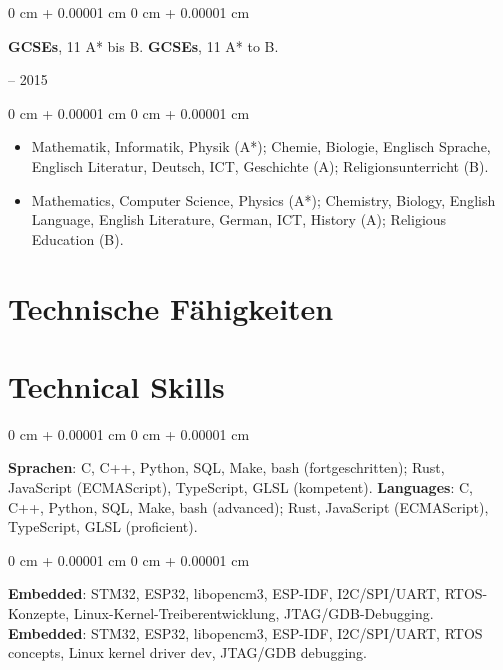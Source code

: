 \documentclass[10pt, letterpaper]{article}
\newenvironment{highlights}{
    \begin{itemize}[
        topsep=0.2 cm,
        parsep=0.2 cm,
        partopsep=0pt,
        itemsep=0.025 cm,
        leftmargin=0 cm + 10pt
    ]
}{
    \end{itemize}
}
\newenvironment{onecolentry}{
    \begin{adjustwidth}{
        0 cm + 0.00001 cm
    }{
        0 cm + 0.00001 cm
    }
}{
    \end{adjustwidth}
}
\newenvironment{twocolentry}[2][]{
    \onecolentry
    \def\secondColumn{#2}
    \setcolumnwidth{\fill, 4.75 cm}
    \begin{paracol}{2}
}{
    \switchcolumn \raggedleft \secondColumn
    \end{paracol}
    \endonecolentry
}
\begin{document}
        \vspace{0.20 cm}
        \begin{twocolentry}{
            2010 – 2015
        }
            \ifdefined\german
            \textbf{GCSEs}, 11 A* bis B.
            \else
            \textbf{GCSEs}, 11 A* to B.
            \fi
        \end{twocolentry}
        
        \vspace{0.10 cm}
        \begin{onecolentry}
            \begin{highlights}
            \ifdefined\german
            \item Mathematik, Informatik, Physik (A*); Chemie, Biologie, Englisch Sprache, Englisch Literatur, Deutsch, ICT, Geschichte (A); Religionsunterricht (B).
            \else
            \item Mathematics, Computer Science, Physics (A*); Chemistry, Biology, English Language, English Literature, German, ICT, History (A); Religious Education (B).
            \fi
            \end{highlights}
        \end{onecolentry}

    \newpage

    \ifdefined\german
    \section{Technische Fähigkeiten}
    \else
    \section{Technical Skills}
    \fi

        \begin{onecolentry}
            \ifdefined\german
            \textbf{Sprachen}: C, C++, Python, SQL, Make, bash (fortgeschritten); Rust, JavaScript (ECMAScript), TypeScript, GLSL (kompetent).
            \else
            \textbf{Languages}: C, C++, Python, SQL, Make, bash (advanced); Rust, JavaScript (ECMAScript), TypeScript, GLSL (proficient).
            \fi
        \end{onecolentry}

        \vspace{0.2 cm}

        \begin{onecolentry}
            \ifdefined\german
            \textbf{Embedded}: STM32, ESP32, libopencm3, ESP-IDF, I2C/SPI/UART, RTOS-Konzepte, Linux-Kernel-Treiberentwicklung, JTAG/GDB-Debugging.
            \else
            \textbf{Embedded}: STM32, ESP32, libopencm3, ESP-IDF, I2C/SPI/UART, RTOS concepts, Linux kernel driver dev, JTAG/GDB debugging.
            \fi
        \end{onecolentry}
\end{document}
